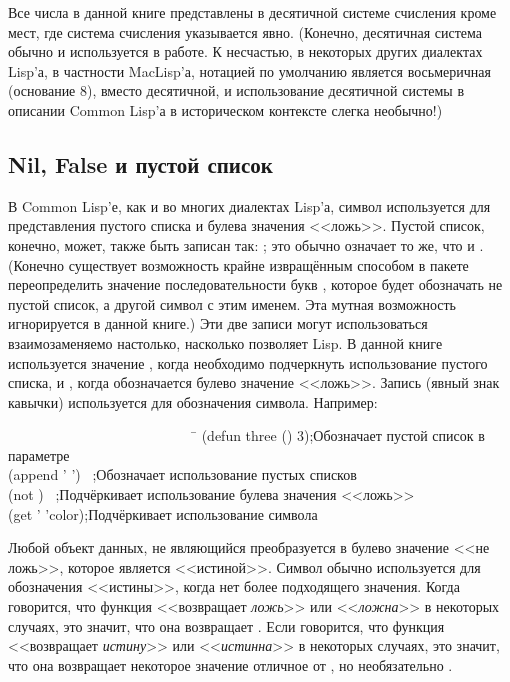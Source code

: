 Все числа в данной книге представлены в десятичной системе счисления кроме мест,
где система счисления указывается явно. 
(Конечно, десятичная система обычно и используется в работе.
К несчастью, в некоторых других диалектах Lisp'а, в частности MacLisp'а,
нотацией по умолчанию является восьмеричная (основание 8), вместо десятичной, и
использование десятичной системы в описании Common Lisp'а в историческом
контексте слегка необычно!) 

\subsection{Nil, False и пустой список}

В Common Lisp'е, как и во многих диалектах Lisp'а, символ  используется
для представления пустого списка и булева значения <<ложь>>. Пустой список,
конечно, может, также быть записан так: \cd{()}; это обычно означает то же, что
и .
(Конечно существует возможность крайне извращённым способом в пакете
переопределить значение последовательности букв , которое будет 
обозначать не пустой список, а другой символ с этим именем. Эта мутная
возможность игнорируется в данной книге.)
Эти две записи могут использоваться взаимозаменяемо настолько, насколько
позволяет Lisp. В данной книге используется значение {\emptylist}, когда необходимо
подчеркнуть использование пустого списка, и {\false}, когда обозначается булево
значение <<ложь>>. Запись  (явный знак кавычки) используется для
обозначения символа.
Например:
\begin{lisp}
~~~~~~~~~~~~~~~~~~~~~~~~~~~\=\kill
(defun three () 3)\>;\textrm{Обозначает пустой список в параметре} \\
(append '{\emptylist} '{\emptylist}) \EV\ {\emptylist}\>;\textrm{Обозначает использование
пустых списков} \\
(not {\false}) \EV\ {\true}\>;\textrm{Подчёркивает использование булева значения <<ложь>>} \\
(get '{\nil} 'color)\>;\textrm{Подчёркивает использование символа}
\end{lisp}

Любой объект данных, не являющийся {\false} преобразуется в булево значение
<<не ложь>>, которое является <<истиной>>. Символ {\true} обычно используется для
обозначения <<истины>>, когда нет более подходящего значения.
Когда говорится, что функция <<возвращает \emph{ложь}>> или <<\emph{ложна}>>
в некоторых случаях, это значит, что она возвращает {\false}.
Если говорится, что функция <<возвращает \emph{истину}>> или
<<\emph{истинна}>> в некоторых случаях, это значит, что она возвращает некоторое
значение отличное от {\false}, но необязательно {\true}.

